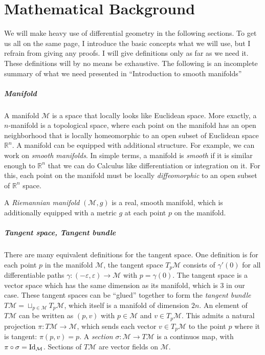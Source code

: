 \documentclass[../thesis.tex]{subfiles}
\begin{document}
\chapter{Mathematical Background}
We will make heavy use of differential geometry in the following sections.
To get us all on the same page, I introduce the basic concepts what we will use, but I refrain from
giving any proofs. I will give definitions only as far as we need it. These definitions
will by no means be exhaustive. The following is an incomplete summary of what we need presented in
``Introduction to smooth manifolds'' \cite{Lee00}

\paragraph{Manifold} A manifold $\mathcal{M}$ is a space that locally looks like Euclidean space.
More exactly, a $n$-manifold is a topological space, where each point on the manifold has an open neighborhood
that is locally homeomorphic to an open subset of Euclidean space $\mathbb{R}^n$.
A manifold can be equipped with additional structure. For example, we can work on \emph{smooth manifolds}.
In simple terms, a manifold is \emph{smooth} if it is similar enough to $\mathbb{R}^n$ that we can do Calculus
like differentiation or integration on it. For this, each point on the manifold must be
locally \emph{diffeomorphic} to an open subset of $\mathbb{R}^n$ space.

A \emph{Riemannian manifold} $(\mathcal{M},g)$ is a real, smooth manifold, which is additionally equipped with
a metric $g$ at each point $p$ on the manifold.

\paragraph{Tangent space, Tangent bundle} There are many equivalent definitions
for the tangent space. One definition is for each point $p$ in the manifold $\mathcal{M}$,
the tangent space $T_p\mathcal{M}$ consists of $\gamma'(0)$ for all differentiable paths $\gamma: (-\varepsilon, \varepsilon) \to \mathcal{M}$
with $p = \gamma(0)$. The tangent space is a vector space which has the same dimension as its manifold,
which is 3 in our case. These tangent spaces can be ``glued'' together to form the
\emph{tangent bundle} $T\mathcal{M} = \sqcup _{p \in \mathcal{M}}T_p\mathcal{M}$, which itself
is a manifold of dimension $2n$. An element of $T\mathcal{M}$ can be written
as $(p,v)$ with $p \in \mathcal{M}$ and $v \in T_p\mathcal{M}$. This admits a natural projection $\pi : T\mathcal{M} \to \mathcal{M}$,
which sends each vector $v \in T_p\mathcal{M}$ to the point $p$ where it is tangent: $\pi(p,v)=p$.
A \emph{section} $\sigma: \mathcal{M} \to T\mathcal{M}$ is a continuos map, with $\pi \circ \sigma = \operatorname{Id}_{\mathcal{M}}$.
Sections of $T\mathcal{M}$ are vector fields on $\mathcal{M}$.
\end{document}

